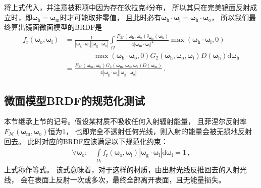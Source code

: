 将上式代入，并注意被积项中因为存在狄拉克$\delta$分布，
所以其只在完美镜面反射成立时，即${\bm\omega}_{\mathrm{h}}={\bm\omega}_{\mathrm{m}}$时才可能取非零值，
且此时必有${\bm\omega}_{\mathrm{h}}\cdot{\bm\omega}_{\mathrm{i}}={\bm\omega}_{\mathrm{h}}\cdot{\bm\omega}_{\mathrm{o}}$，
所以我们最终算出镜面微面模型的BRDF是
\begin{align}\label{eq:08ex01-BRDFMicrofacetFinal}
    f_{\mathrm{r}}({\bm\omega}_{\mathrm{o}},{\bm\omega}_{\mathrm{i}})
     & =\frac{1}{|{\bm\omega}_{\mathrm{g}}\cdot{\bm\omega}_{\mathrm{i}}||{\bm\omega}_{\mathrm{g}}\cdot{\bm\omega}_{\mathrm{o}}|}
    \int\limits_{\varOmega}\frac{F_{\mathcal{M}}({\bm\omega}_{\mathrm{h}},{\bm\omega}_{\mathrm{o}})
    \delta_{{\bm\omega}_{\mathrm{m}}}({\bm\omega}_{\mathrm{h}})}
    {4|{\bm\omega}_{\mathrm{m}}\cdot{\bm\omega}_{\mathrm{i}}|^2}
    \max({\bm\omega}_{\mathrm{h}}\cdot{\bm\omega}_{\mathrm{i}},0)\nonumber                                                       \\
     & \qquad\qquad\max({\bm\omega}_{\mathrm{h}}\cdot{\bm\omega}_{\mathrm{o}},0)
    G_2({\bm\omega}_{\mathrm{h}},{\bm\omega}_{\mathrm{o}},{\bm\omega}_{\mathrm{i}})
    D({\bm\omega}_{\mathrm{h}})\mathrm{d}{\bm\omega}_{\mathrm{h}}\nonumber                                                       \\
     & =\frac{F_{\mathcal{M}}({\bm\omega}_{\mathrm{m}},{\bm\omega}_{\mathrm{o}})
    G_2({\bm\omega}_{\mathrm{m}},{\bm\omega}_{\mathrm{o}},{\bm\omega}_{\mathrm{i}})D({\bm\omega}_{\mathrm{m}})}
    {4|{\bm\omega}_{\mathrm{g}}\cdot{\bm\omega}_{\mathrm{i}}||{\bm\omega}_{\mathrm{g}}\cdot{\bm\omega}_{\mathrm{o}}|}\, .
\end{align}

\subsection{微面模型BRDF的规范化测试}\label{sub:微面模型BRDF的规范化测试}
本节继承上节的记号。假设某材质不吸收任何入射辐射能量，
且菲涅尔反射率$F_{\mathcal{M}}({\bm\omega}_{\mathrm{m}},{\bm\omega}_{\mathrm{o}})$恒为1，
也即完全不透射任何光线，则入射的能量会被无损地反射回去。
此时对应的BRDF应该满足以下规范化约束：
\begin{align}\label{eq:08ex-01-WhiteFurnaceTest}
    \forall {\bm\omega}_{\mathrm{o}}: \quad\int\limits_{{\varOmega}_{\mathrm{i}}}
    f_{\mathrm{r}}({\bm\omega}_{\mathrm{o}},{\bm\omega}_{\mathrm{i}})
    |{\bm\omega}_{\mathrm{g}}\cdot{\bm\omega}_{\mathrm{i}}|\mathrm{d}{\bm\omega}_{\mathrm{i}}=1\, ,
\end{align}
上式称作等式。
该式意味着，对于这样的材质，由出射光线反推回去的入射光线，
会在表面上反射一次或多次，最终全部离开表面，且无能量损失。

